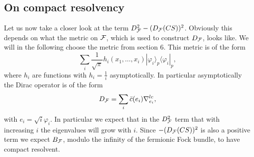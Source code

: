 \documentclass[letterpaper,11pt]{article}
\def\cf{{\cal F}}
\begin{document}
\subsection{On compact resolvency}




Let us now take a closer look at the term $D_\cf^2-(D_\cf (CS))^2$. Obviously this depends on what the metric on $\cf$, which is used to construct  $D_\cf$, looks like. We will in the following choose the metric from section 6. This metric is of the form 
$$\sum_i \frac{1}{\sqrt{\pi}} h_i(x_1,\ldots , x_i) |\varphi_i \rangle_p \langle \varphi_i |_p,$$
where $h_i$ are functions with $h_i =\frac{1}{i}$ asymptotically. In particular asymptotically the Dirac operator is of the form 
$$D_\cf  =\sum_i     \bar{c}(e_i) \nabla^{lc}_{e_i}  ,$$
with $e_i=\sqrt{i}\varphi_i $. In particular we expect that in the $D^2_\cf$ term that with increasing $i$ the eigenvalues will grow with $i$. Since $-(D_\cf(CS))^2$ is also a positive term we expect $B_\cf$, modulo the infinity of the fermionic Fock bundle, to have compact resolvent. 
\end{document}
